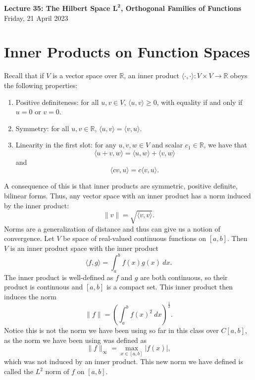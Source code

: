 \documentclass[11pt]{article}
\theoremstyle{definition}
\newcommand{\R}{\mathbb{R}}                      %
\begin{document}
\thispagestyle{empty}

\begin{center}
{\LARGE \bf Lecture 35: The Hilbert Space $\mathbf{L}^\mathbf{2}$, Orthogonal Families of Functions}\\
{\large Friday, 21 April 2023}\\
\end{center}

\section{Inner Products on Function Spaces}
Recall that if $V$ is a vector space over $\R$, an inner product $\langle \cdot,\cdot \rangle:V\times V\to \R$ obeys the following properties:
\begin{enumerate}
    \item Positive definiteness: for all $u,v\in V$, $\langle u, v\rangle \geq 0$, with equality if and only if $u=0$ or $v=0$.
    \item Symmetry: for all $u,v\in\R$, $\langle u,v\rangle = \langle v, u \rangle$.
    \item Linearity in the first slot: for any $u,v,w\in V$ and scalar $c_1\in \R$, we have that
    $$
    \langle u+v, w\rangle = \langle u,w\rangle + \langle v, w \rangle 
    $$
    and
    $$
    \langle cv , u \rangle = c\langle v,u\rangle.
    $$
\end{enumerate}
A consequence of this is that inner products are symmetric, positive definite, bilinear forms. Thus, any vector space with an inner product has a norm induced by the inner product:
$$
\|v\|=\sqrt{\langle v,v \rangle}.
$$
Norms are a generalization of distance and thus can give us a notion of convergence.
\ex Let $V$ be space of real-valued continuous functions on $[a, b]$. Then $V$ is an inner product space with the inner product
$$\langle f, g \rangle = \int_a^b f(x)g(x)~dx.$$
The inner product is well-defined as $f$ and $g$ are both continuous, so their product is continuous and $[a,b]$ is a compact set. This inner product then induces the norm
$$
\|f\| = \left(\int_a^b f(x)^2~dx\right)^\frac{1}{2}.
$$
Notice this is not the norm we have been using so far in this class over $C[a,b]$, as the norm we have been using was defined as
$$
\|f\|_\infty = \max_{x\in[a,b]}|f(x)|,
$$
which was not induced by an inner product. This new norm we have defined is called the $L^2$ norm of $f$ on $[a,b]$. 
\end{document}
